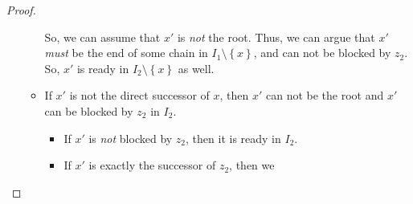 \begin{proof}
\begin{itemize}
\begin{itemize}
      So, we can assume that $x'$ is \emph{not} the root. Thus, we can argue that $x'$ \emph{must} be the end of some chain in $I_1\setminus\left\{ x \right\}$, and can not be blocked by $z_2$. So, $x'$ is ready in $I_2\setminus\left\{ x \right\}$ as well.
    \item If $x'$ is not the direct successor of $x$, then $x'$ can not be the root and $x'$ can be blocked by $z_2$ in $I_2$.
      \begin{itemize}
      \item If $x'$ is \emph{not} blocked by $z_2$, then it is ready in $I_2$.
      \item If $x'$ is exactly the successor of $z_2$, then we 
      \end{itemize}

    \end{itemize}

  \end{itemize}

\end{proof}

